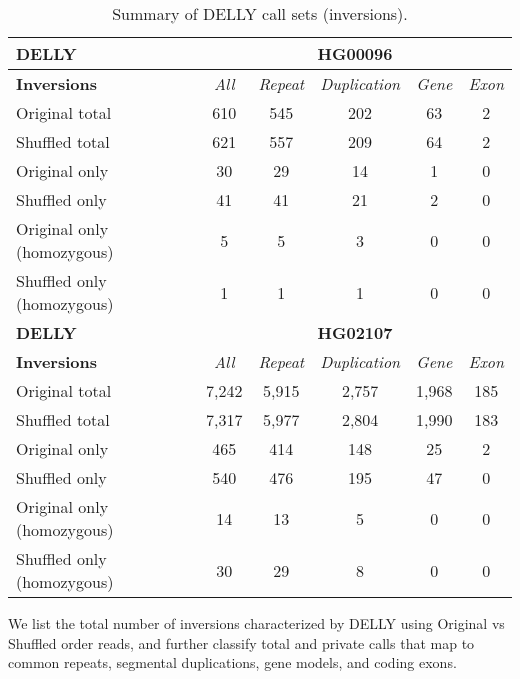 \begin{table}[htb]
\caption{ Summary of DELLY call sets (inversions). }
\begin{center}
\begin{tabular}{|l|c||c|c|c|c|}
\hline
{\bf DELLY} & \multicolumn{5}{|c|}{\bf HG00096} \\
\hline
\cline{2-6}
{\bf Inversions} & {\it All} & {\it Repeat} & {\it Duplication} & {\it Gene} & {\it Exon} \\
\hline
Original total & 610 & 545 & 202 & 63 & 2\\ 
\hline
Shuffled total & 621 & 557 & 209 & 64 & 2\\ 
\hline
Original only & 30 & 29 & 14 & 1 & 0\\ 
\hline
Shuffled only & 41 & 41 & 21 & 2 & 0\\ 
\hline
Original only (homozygous) & 5 & 5 & 3 & 0 & 0\\ 
\hline
Shuffled only (homozygous) & 1 & 1 & 1 & 0 & 0\\ 
\hline
\hline
{\bf DELLY} & \multicolumn{5}{|c|}{\bf HG02107} \\
\hline
\cline{2-6}
{\bf Inversions} & {\it All} & {\it Repeat} & {\it Duplication} & {\it Gene} & {\it Exon} \\
\hline
Original total & 7,242 & 5,915 & 2,757 & 1,968 & 185\\ 
\hline
Shuffled total & 7,317 & 5,977 & 2,804 & 1,990 & 183\\ 
\hline
Original only & 465 & 414 & 148 & 25 & 2\\ 
\hline
Shuffled only & 540 & 476 & 195 & 47 & 0\\ 
\hline
Original only (homozygous) & 14 & 13 & 5 & 0 & 0\\ 
\hline
Shuffled only (homozygous) & 30 & 29 & 8 & 0 & 0\\ 
\hline
\end{tabular}
\end{center}
{\footnotesize We list the total number of inversions characterized by DELLY using Original vs Shuffled order reads, 
and further classify total and private calls that map to common repeats, segmental duplications, gene models, and coding exons.}
\label{supptab:orig-vs-shuf-delly-inv}
\end{table}

